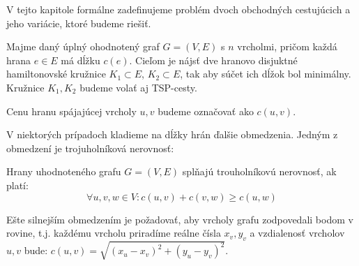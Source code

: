 V tejto kapitole formálne zadefinujeme problém dvoch obchodných cestujúcich
a jeho variácie, ktoré budeme riešiť.

\begin{definicia}
Majme daný úplný ohodnotený graf $G = (V, E)$ s $n$ vrcholmi, pričom každá hrana
$e \in E$ má dĺžku $c(e)$. Cieľom je nájsť dve hranovo disjuktné hamiltonovské kružnice
$K_1 \subset E$, $K_2 \subset E$, tak aby súčet ich dĺžok bol minimálny.
Kružnice $K_1, K_2$ budeme volať aj TSP-cesty.
\end{definicia}

\begin{poznamka}
Cenu hranu spájajúcej vrcholy $u, v$ budeme označovať ako $c(u, v)$. 
\end{poznamka}

V niektorých prípadoch kladieme na dĺžky hrán ďalšie obmedzenia.
Jedným z obmedzení je trojuholníková nerovnosť:

\begin{definicia}
Hrany uhodnoteného grafu $G = (V, E)$ splňajú trouholníkovú nerovnosť, ak platí:
$$\forall u,v,w \in V: c(u,v) + c(v,w) \geq c(u,w)$$
\end{definicia}

Ešte silnejším obmedzením je požadovať, aby vrcholy grafu zodpovedali bodom v rovine, t.j.
každému vrcholu priradíme reálne čísla $x_v, y_v$ a vzdialenosť vrcholov $u, v$ bude:
$c(u,v) = \sqrt{(x_u - x_v)^2 + (y_u - y_v)^2}$.
